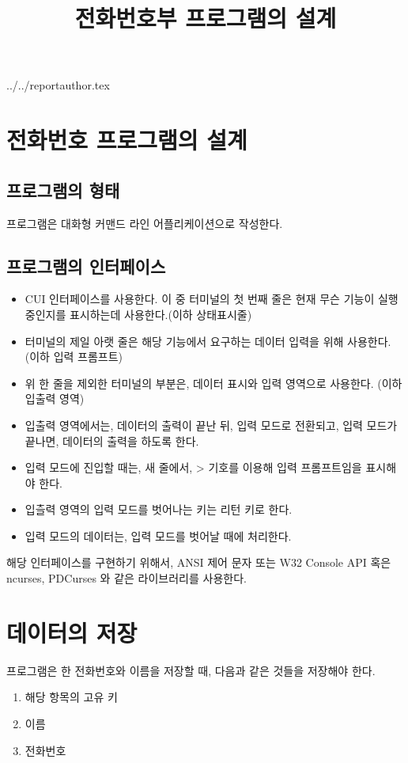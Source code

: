 \documentclass {article}
\begin{document}
\title {전화번호부 프로그램의 설계}
 {../../reportauthor.tex}
\maketitle

\clearpage

\section{전화번호 프로그램의 설계}
\subsection{프로그램의 형태}
프로그램은 대화형 커맨드 라인 어플리케이션으로 작성한다.
\subsection{프로그램의 인터페이스}
\begin{itemize}
\item CUI 인터페이스를 사용한다. 이 중 터미널의 첫 번째 줄은 현재 무슨 기능이 실행 중인지를 표시하는데 사용한다.(이하 상태표시줄)
\item 터미널의 제일 아랫 줄은 해당 기능에서 요구하는 데이터 입력을 위해 사용한다.(이하 입력 프롬프트)
\item 위 한 줄을 제외한 터미널의 부분은, 데이터 표시와 입력 영역으로 사용한다. (이하 입출력 영역)
\item 입출력 영역에서는, 데이터의 출력이 끝난 뒤, 입력 모드로 전환되고, 입력 모드가 끝나면, 데이터의 출력을 하도록 한다.
\item 입력 모드에 진입할 때는, 새 줄에서, > 기호를 이용해 입력 프롬프트임을 표시해야 한다.
\item 입츨력 영역의 입력 모드를 벗어나는 키는 리턴 키로 한다.
\item 입력 모드의 데이터는, 입력 모드를 벗어날 때에 처리한다.
\end{itemize}

해당 인터페이스를 구현하기 위해서, ANSI 제어 문자 또는 W32 Console API 혹은 ncurses, PDCurses 와 같은 라이브러리를 사용한다.

\section{데이터의 저장}
프로그램은 한 전화번호와 이름을 저장할 때, 다음과 같은 것들을 저장해야 한다.

\begin{enumerate}
\item 해당 항목의 고유 키
\item 이름
\item 전화번호
\end{enumerate}
\end{document}
